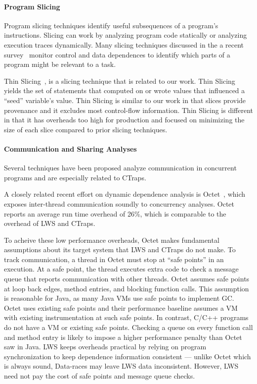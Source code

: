 \documentclass[pageno,nohyperref]{jpaper}
\newcommand{\ctraps}{CTraps\xspace}
\newcommand{\lws}{LWS\xspace}
\begin{document}
\paragraph{Program Slicing}
Program slicing techniques identify useful subsequences of a program's
instructions.   Slicing can work by analyzing program code statically or
analyzing execution traces dynamically.  Many slicing techniques discussed in
the a recent survey~\cite{tipslicingsurvey} monitor control and data
dependences to identify which parts of a program might be relevant to a task.

Thin Slicing~\cite{thinslicing}, is a slicing technique that is related to our
work.  Thin Slicing yields the set of statements that computed on or wrote
values that influenced a ``seed'' variable's value.  Thin
Slicing is similar to our work in that slices provide provenance and it excludes most
control-flow information.  Thin Slicing is different in that it has
overheads too high for production and focused on minimizing the size of each
slice compared to prior slicing techniques. 


\paragraph{Communication and Sharing Analyses}
Several techniques have been proposed analyze communication in concurrent
programs and are especially related to \ctraps.  

A closely related recent effort on dynamic dependence analysis is
Octet~\cite{octet}, which exposes inter-thread communication soundly to
concurrency analyses.   Octet reports an average run time overhead of 26\%,
which is comparable to the overhead of \lws and \ctraps.  

To acheive these low performance overheads, Octet makes fundamental assumptions
about its target system that \lws and \ctraps do not make.  To track
communication, a thread in Octet must stop at ``safe points'' in an execution.
At a safe point, the thread executes extra code to check a message queue that
reports communication with other threads.  Octet assumes safe points at loop
back edges, method entries, and blocking function calls.  This assumption is
reasonable for Java, as many Java VMs use safe points to implement GC.  Octet
uses existing safe points and their performance baseline assumes a VM with
existing instrumentation at such safe points.  In contrast, C/C++ programs do
not have a VM or existing safe points.   Checking a queue on every function
call and method entry is likely to impose a higher performance penalty than
Octet saw in Java.  \lws keeps overheads practical by relying on program
synchronization to keep dependence information consistent --- unlike Octet
which is always sound, Data-races may leave \lws data inconsistent.  However,
\lws need not pay the cost of safe points and message queue checks.
\end{document}
